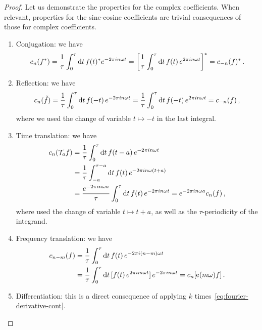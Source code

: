 \begin{proof} Let us demonstrate the properties for the complex coefficients. When
	relevant, properties for the sine-cosine coefficients are trivial consequences of those
	for complex coefficients.
	\begin{enumerate}
		\item Conjugation: we have
		      \begin{equation}
			      c_n(f^*)=\frac{1}{\tau}\int_0^{\tau}\mathrm{d} t\, f(t)^*e^{-2\pi i n\omega t}
			      =\left[\frac{1}{\tau}\int_0^{\tau}\mathrm{d} t\, f(t)\,e^{2\pi i n\omega t}\right]^*
			      =c_{-n}(f)^*\,.
		      \end{equation}
		\item Reflection: we have
		      \begin{equation}
			      c_n(\tilde{f})=\frac{1}{\tau}\int_0^{\tau}\mathrm{d} t\, f(-t)\,e^{-2\pi i n\omega t}
			      =\frac{1}{\tau}\int_0^{\tau}\mathrm{d} t\, f(-t)\,e^{2\pi i n\omega t}=c_{-n}(f)\,,
		      \end{equation}
		      where we used the change of variable $t\mapsto -t$ in the last integral.
		\item Time translation: we have
		      \begin{align}
			      c_n(\mathcal{T}_af)
			       & =\frac{1}{\tau}\int_0^{\tau}\mathrm{d} t\, f(t-a)\,e^{-2\pi i n\omega t}        \\
			       & =\frac{1}{\tau}\int_{-a}^{\tau-a}\mathrm{d} t\, f(t)\,e^{-2\pi i n\omega (t+a)} \\
			       & =\frac{e^{-2\pi i n\omega a}}{\tau}\int_{0}^{\tau}\mathrm{d} t\, f(t)\,
			      e^{-2\pi i n\omega t}
			      =e^{-2\pi i n\omega a}c_n(f)\,,
		      \end{align}
		      where used the change of variable $t\mapsto t+a$, as well as the $\tau$-periodicity
		      of the integrand.
		\item Frequency translation: we have
		      \begin{align}
			      c_{n-m}(f)
			       & =\frac{1}{\tau}\int_0^{\tau}\mathrm{d} t\, f(t)\,e^{-2\pi i (n-m)\omega t} \\
			       & =\frac{1}{\tau}\int_0^{\tau}\mathrm{d} t\,
			      [f(t)\,e^{2\pi i m\omega t}]\,e^{-2\pi i n\omega t}=c_{n}[\operatorname{e}(m\omega)f]\,.
		      \end{align}
		\item Differentiation: this is a direct consequence of applying $k$
		      times~\cref{eq:fourier-derivative-cont}.
	\end{enumerate}
\end{proof}
